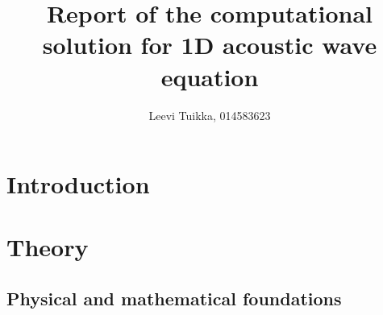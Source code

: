 \documentclass[]{article}
\title{Report of the computational solution for 1D acoustic wave equation}
\author{Leevi Tuikka, 014583623}
\begin{document}
\maketitle
{} 

\newpage
{}

\section{Introduction}

\newpage

\section{Theory}

\subsection{Physical and mathematical foundations}
\end{document}
